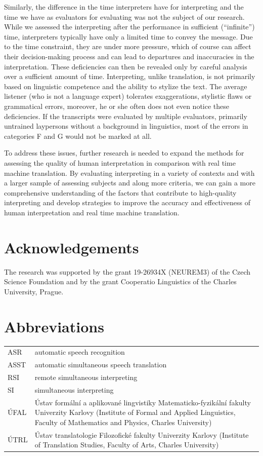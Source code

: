 \documentclass[output=paper]{langscibook}
\begin{document}
Similarly, the difference in the time interpreters have for interpreting and the time we have as evaluators for evaluating was not the subject of our research. While we assessed the interpreting after the performance in sufficient (“infinite”) time, interpreters typically have only a limited time to convey the message. Due to the time constraint, they are under more pressure, which of course can affect their decision-making process and can lead to departures and inaccuracies in the interpretation. These deficiencies can then be revealed only by careful analysis over a sufficient amount of time. Interpreting, unlike translation, is not primarily based on linguistic competence and the ability to stylize the text. The average listener (who is not a language expert) tolerates exaggerations, stylistic flaws or grammatical errors, moreover, he or she often does not even notice these deficiencies. If the transcripts were evaluated by multiple evaluators, primarily untrained laypersons without a background in linguistics, most of the errors in categories F and G would not be marked at all.

To address these issues, further research is needed to expand the methods for assessing the quality of human interpretation in comparison with real time machine translation. By evaluating interpreting in a variety of contexts and with a larger sample of assessing subjects and along more criteria, we can gain a more comprehensive understanding of the factors that contribute to high-quality interpreting and develop strategies to improve the accuracy and effectiveness of human interpretation and real time machine translation.

\section*{Acknowledgements}

The research was supported by the grant 19-26934X (NEUREM3) of the Czech Science Foundation and by the grant Cooperatio Linguistics of the Charles University, Prague.

\section*{Abbreviations}

\begin{tabularx}{\textwidth}{lQ}
ASR & automatic speech recognition\\
ASST & automatic simultaneous speech translation\\
RSI & remote simultaneous interpreting\\
SI & simultaneous interpreting\\
ÚFAL & Ústav formální a aplikované lingvistiky Matematicko-fyzikální fakulty Univerzity Karlovy (Institute of Formal and Applied Linguistics, Faculty of Mathematics and Physics, Charles University)\\
ÚTRL & Ústav translatologie Filozofické fakulty Univerzity Karlovy (Institute of Translation Studies, Faculty of Arts, Charles University)\\
\end{tabularx}
\sloppy\printbibliography[heading=subbibliography,notkeyword=this]
\end{document}
